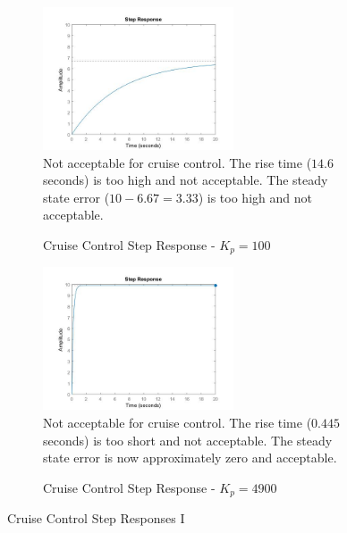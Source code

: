 \documentclass[paper=letter, fontsize=11pt]{scrartcl}
\numberwithin{equation}{section}
\numberwithin{figure}{section}
\numberwithin{table}{section}
\begin{document}
\begin{figure}[h]
	\begin{subfigure}{.5\textwidth}
		\centering
	    \includegraphics[height=160px]{graphics/step-kp100}\\
		Not acceptable for cruise control.
		The rise time ($14.6$ seconds) is too high and not acceptable.
		The steady state error ($10-6.67 = 3.33$) is too high and not acceptable.
		\caption{Cruise Control Step Response - $K_{p} = 100$}
		\label{fig:step_kp100}
	\end{subfigure}
	\begin{subfigure}{.5\textwidth}
		\centering
	    \includegraphics[height=160px]{graphics/step-kp4900}\\
		Not acceptable for cruise control.
		The rise time ($0.445$ seconds) is too short and not acceptable.
		The steady state error is now approximately zero and acceptable.
		\caption{Cruise Control Step Response - $K_{p} = 4900$}
		\label{fig:step_kp4900}
	\end{subfigure}
	\caption{Cruise Control Step Responses I}
	\label{fig:cc_step_responses_i}
\end{figure}

\end{document}
